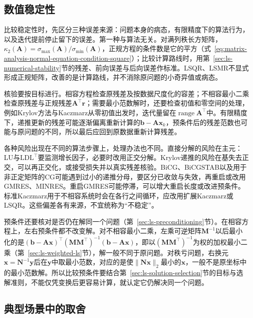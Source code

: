 \subsection{数值稳定性}
\label{sec:ls-method-selection-stability}

比较稳定性时，先区分三种误差来源：问题本身的病态，有限精度下的算法行为，以及迭代提前停止留下的误差。第一种与算法无关。对满列秩长方矩阵，$\kappa_2(\bm A)=\sigma_{\max}(\bm A)/\sigma_{\min}(\bm A)$，正规方程的条件数是它的平方（式~\eqref{eq:matrix-analysis-normal-equation-condition-square}）；比较计算路线时，用第~\ref{sec:ls-numerical-stability}节的残差、前向误差与后向误差作标准。LSQR、LSMR不显式形成正规矩阵，改善的是计算路线，并不消除原问题的小奇异值或病态。

核验要按目标进行。相容方程检查原残差及按数据尺度化的容差；不相容最小二乘检查原残差与正规残差$\bm A^\top\bm r$；需要最小范数解时，还要检查初值和零空间的处理，例如Krylov方法与Kaczmarz从零初值出发时，迭代量留在$\operatorname{range}\bm A^\top$中。有限精度下，递推更新的残差可能逐渐偏离重新计算的$\bm b-\bm A\bm x_k$，预条件后的残差范数也可能与原问题的不同，所以最后应回到原数据重新计算残差。

各种风险出现在不同的算法步骤上，处理办法也不同。直接分解的风险在主元：LU与$\mathrm{LDL}^\top$要监测增长因子，必要时改用正交分解。Krylov递推的风险在基失去正交，可以再正交化，或接受损失并以真实残差核验。BiCG、BiCGSTAB以及用于非正定矩阵的CG可能遇到过小的递推分母，要区分已收敛与失效，再重启或改用GMRES、MINRES。重启GMRES可能停滞，可以增大重启长度或改进预条件。标准Kaczmarz用于不相容系统时会在各行之间循环，应改用扩展Kaczmarz或LSQR。这些偏差各有来源，不宜统称为“不稳定”。

预条件还要核对是否仍在解同一个问题（第~\ref{sec:ls-preconditioning}节）。在相容方程上，左右预条件都不改变解。对不相容最小二乘，左乘可逆矩阵$\bm M^{-1}$以后最小化的是$(\bm b-\bm A\bm x)^\top(\bm M\bm M^\top)^{-1}(\bm b-\bm A\bm x)$，即以$(\bm M\bm M^\top)^{-1}$为权的加权最小二乘（第~\ref{sec:ls-weighted-ls}节），解一般不同于原问题。对秩亏问题，右换元$\bm x=\bm N^{-1}\bm y$后在$\bm y$中取最小范数，对应的是使$\lVert\bm N\bm x\rVert_2$最小的$\bm x$，一般不是原坐标中的最小范数解。所以比较预条件要结合第~\ref{sec:ls-solution-selection}节的目标与选解准则，不能仅凭变换后更容易计算，就认定它仍解决同一个问题。

\subsection{典型场景中的取舍}
\label{sec:ls-method-selection-scenarios}

